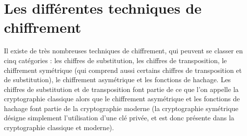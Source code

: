\chapter{Les différentes techniques de
chiffrement\label{chap:Techniques}}
Il existe de très nombreuses techniques de chiffrement, qui
peuvent se classer en cinq catégories : les chiffres de
substitution, les chiffres de transposition, le chiffrement
symétrique (qui comprend aussi certains chiffres de transposition
et de substitution), le chiffrement asymétrique et les fonctions de
hachage.
Les chiffres de substitution et de transposition font partie de ce
que l'on appelle la cryptographie classique alors que le
chiffrement asymétrique et les fonctions de hachage
font partie de la cryptographie moderne (la cryptographie
symétrique désigne simplement l'utilisation d'une clé privée, et
est donc présente dans la cryptographie classique et moderne).










